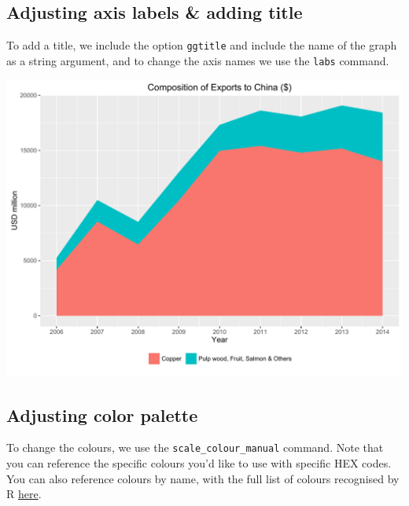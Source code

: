 \documentclass[]{article}
\newenvironment{Shaded}{\begin{snugshade}}{\end{snugshade}}
\newcommand{\KeywordTok}[1]{\textcolor[rgb]{0.13,0.29,0.53}{\textbf{{#1}}}}
\newcommand{\DataTypeTok}[1]{\textcolor[rgb]{0.13,0.29,0.53}{{#1}}}
\newcommand{\StringTok}[1]{\textcolor[rgb]{0.31,0.60,0.02}{{#1}}}
\newcommand{\NormalTok}[1]{{#1}}
\begin{document}
\subsection{Adjusting axis labels \& adding
title}\label{adjusting-axis-labels-adding-title-1}

To add a title, we include the option \texttt{ggtitle} and include the
name of the graph as a string argument, and to change the axis names we
use the \texttt{labs} command.

\begin{Shaded}
\end{Shaded}

\begin{center}\includegraphics{0_all_posts_pdf/area_5-1} \end{center}

\subsection{Adjusting color palette}\label{adjusting-color-palette-1}

To change the colours, we use the \texttt{scale\_colour\_manual}
command. Note that you can reference the specific colours you'd like to
use with specific HEX codes. You can also reference colours by name,
with the full list of colours recognised by R
\href{http://www.stat.columbia.edu/~tzheng/files/Rcolor.pdf}{here}.
\end{document}
